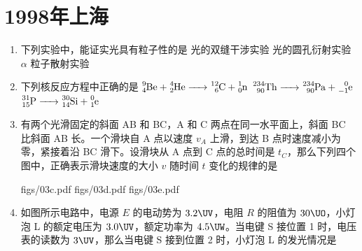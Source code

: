 \documentclass[\gkver]{gaokaozhenti}
\begin{document}
\chapter{1998年上海}

\begin{enumerate}
\item
下列实验中，能证实光具有粒子性的是
{光的双缝干涉实验}
{光的圆孔衍射实验}
{$\alpha$ 粒子散射实验}


\item
下列核反应方程中正确的是
{$\ce{^{9}_{4}Be + ^{4}_{2}He -> ^{12}_{6}C + ^{1}_{0}n}$}
{$\ce{^{234}_{90}Th -> ^{234}_{90}Pa + ^{0}_{-1}e}$}
{$\ce{^{31}_{15}P -> ^{30}_{14}Si + ^{0}_{1}e}$}


\item
有两个光滑固定的斜面 AB 和 BC，A 和 C 两点在同一水平面上，斜面 BC 比斜面 AB 长。一个滑块自 A 点以速度 $v_{A}$ 上滑，到达 B 点时速度减小为零，紧接着沿 BC 滑下。设滑块从 A 点到 C 点的总时间是 $t_{C}$，那么下列四个图中，正确表示滑块速度的大小 $v$ 随时间 $t$ 变化的规律的是

\onepicture[w=5cm]{}

{figs/03c.pdf}
{figs/03d.pdf}
{figs/03e.pdf}


\item
如图所示电路中，电源 $E$ 的电动势为 $3.2\UV$，电阻 $R$ 的阻值为 $30\UO$，小灯泡 L 的额定电压为 $3.0\UV$，额定功率为 $4.5\UW$。当电键 S 接位置 1 时，电压表的读数为 $3\UV$，那么当电键 S 接到位置 2 时，小灯泡 L 的发光情况是


\end{enumerate}
\end{document}

